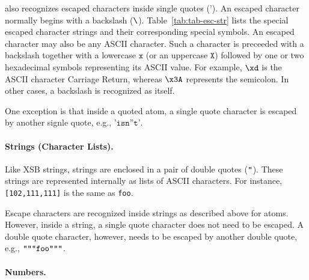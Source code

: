 \documentclass[11pt]{report}
\begin{document}
\FLORA also recognizes escaped characters inside single quotes
($\texttt{'}$).  An escaped character normally begins with a backslash
($\texttt{\bksl}$).  Table~\ref{tab:tab-esc-str} lists the special escaped
character strings and their corresponding special symbols. An escaped
character may also be any ASCII character. Such a character is preceeded
with a backslash together with a lowercase $\texttt{x}$ (or an uppercase
$\texttt{X}$) followed by one or two hexadecimal symbols representing its
ASCII value. For example, $\texttt{{\bksl}xd}$ is the ASCII character
Carriage Return, whereas $\texttt{{\bksl}x3A}$ represents the semicolon. In
other cases, a backslash is recognized as itself.

One exception is that inside a quoted atom, a single quote character is escaped by another
signle quote, e.g., $\texttt{'isn''t'}$.

\paragraph{Strings (Character Lists).}

Like XSB strings, \FLORA strings are enclosed in a pair of double quotes
($\texttt{{\dq}}$).  These strings are represented internally as lists of
ASCII characters. For instance, \mbox{\texttt{[102,111,111]}} is the same
as \texttt{{\dq}foo{\dq}}.

Escape characters are recognized inside \FLORA strings as described above
for \FLORA atoms.  However, inside a string, a single quote character does
not need to be escaped. A double quote character, however, needs to be
escaped by another double quote, e.g.,
$\texttt{{\dq}{\dq}{\dq}foo{\dq}{\dq}{\dq}}$.

\paragraph{Numbers.}
\end{document}
